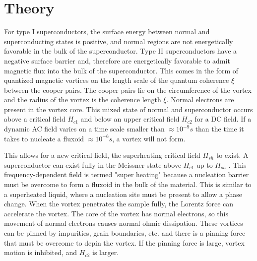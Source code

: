     

       
    
    
    
    
\section{Theory}

    For type I superconductors, the surface energy between normal and superconducting states is positive, and normal regions are not energetically favorable in the bulk of the superconductor. Type II superconductors have a negative surface barrier and, therefore are energetically favorable to admit magnetic flux into the bulk of the superconductor. This comes in the form of quantized magnetic vortices on the length scale of the quantum coherence $\xi$ between the cooper pairs. The cooper pairs lie on the circumference of the vortex and the radius of the vortex is the coherence length $\xi$. Normal electrons are present in the vortex core. This mixed state of normal and superconductor occurs above a critical field $H_{c1}$ and below an upper critical field $H_{c2}$ for a DC field. If a dynamic AC field varies on a time scale smaller than $\approx 10^{-9} s$ \cite{flippenRadialVelocityMagnetic1965} than the time it takes to nucleate a fluxoid $\approx 10^{-6} s$, a vortex will not form. 
    
    This allows for a new critical field, the superheating critical field $H_{sh}$ to exist. A superconductor can exist fully in the Meissner state above $H_{c1}$ up to $H_{sh}$ \cite{matriconSuperheatingFieldsSuperconductors1967}. This frequency-dependent field is termed "super heating" because a nucleation barrier must be overcome to form a fluxoid in the bulk of the material. This is similar to a superheated liquid, where a nucleation site must be present to allow a phase change. When the vortex penetrates the sample fully, the Lorentz force can accelerate the vortex. The core of the vortex has normal electrons, so this movement of normal electrons causes normal ohmic dissipation. These vortices can be pinned by impurities, grain boundaries, etc. and there is a pinning force that must be overcome to depin the vortex. If the pinning force is large, vortex motion is inhibited, and $H_{c2}$ is larger. 


